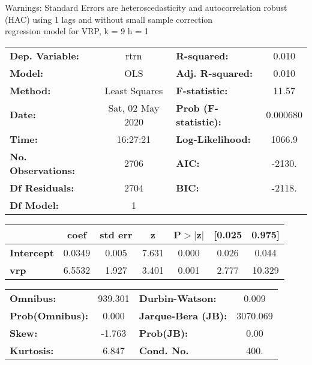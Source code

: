 Warnings: \newline
 [1] Standard Errors are heteroscedasticity and autocorrelation robust (HAC) using 1 lags and without small sample correction\\ 

regression model for VRP, k = 9 h = 1\begin{center}
\begin{tabular}{lclc}
\toprule
\textbf{Dep. Variable:}    &       rtrn       & \textbf{  R-squared:         } &     0.010   \\
\textbf{Model:}            &       OLS        & \textbf{  Adj. R-squared:    } &     0.010   \\
\textbf{Method:}           &  Least Squares   & \textbf{  F-statistic:       } &     11.57   \\
\textbf{Date:}             & Sat, 02 May 2020 & \textbf{  Prob (F-statistic):} &  0.000680   \\
\textbf{Time:}             &     16:27:21     & \textbf{  Log-Likelihood:    } &    1066.9   \\
\textbf{No. Observations:} &        2706      & \textbf{  AIC:               } &    -2130.   \\
\textbf{Df Residuals:}     &        2704      & \textbf{  BIC:               } &    -2118.   \\
\textbf{Df Model:}         &           1      & \textbf{                     } &             \\
\bottomrule
\end{tabular}
\begin{tabular}{lcccccc}
                   & \textbf{coef} & \textbf{std err} & \textbf{z} & \textbf{P$> |$z$|$} & \textbf{[0.025} & \textbf{0.975]}  \\
\midrule
\textbf{Intercept} &       0.0349  &        0.005     &     7.631  &         0.000        &        0.026    &        0.044     \\
\textbf{vrp}       &       6.5532  &        1.927     &     3.401  &         0.001        &        2.777    &       10.329     \\
\bottomrule
\end{tabular}
\begin{tabular}{lclc}
\textbf{Omnibus:}       & 939.301 & \textbf{  Durbin-Watson:     } &    0.009  \\
\textbf{Prob(Omnibus):} &   0.000 & \textbf{  Jarque-Bera (JB):  } & 3070.069  \\
\textbf{Skew:}          &  -1.763 & \textbf{  Prob(JB):          } &     0.00  \\
\textbf{Kurtosis:}      &   6.847 & \textbf{  Cond. No.          } &     400.  \\
\bottomrule
\end{tabular}
\end{center}

